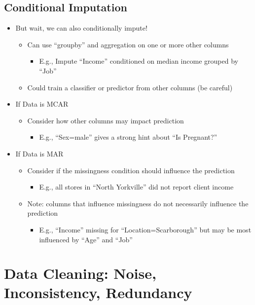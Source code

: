\documentclass[11pt]{article}
\theoremstyle{definition}
\begin{document}
\subsection{Conditional Imputation}
\begin{itemize}
    \item But wait, we can also conditionally impute!
    \begin{itemize}
        \item Can use “groupby” and aggregation on one or more other columns
        \begin{itemize}
            \item E.g., Impute “Income” conditioned on median income grouped by “Job”
        \end{itemize}
        \item Could train a classifier or predictor from other columns (be careful)
    \end{itemize}
    \item If Data is MCAR
    \begin{itemize}
        \item Consider how other columns may impact prediction
        \begin{itemize}
            \item E.g., “Sex=male” gives a strong hint about “Is Pregnant?”
        \end{itemize}
    \end{itemize}
    \item If Data is MAR
    \begin{itemize}
        \item Consider if the missingness condition should influence the prediction
        \begin{itemize}
            \item E.g., all stores in “North Yorkville” did not report client income
        \end{itemize}
        \item Note: columns that influence missingness do not necessarily influence the prediction
        \begin{itemize}
            \item E.g., “Income” missing for “Location=Scarborough” but may be most influenced by “Age” and “Job”
        \end{itemize}
    \end{itemize}
\end{itemize}
\section{Data Cleaning: Noise,
Inconsistency, Redundancy}
\end{document}
